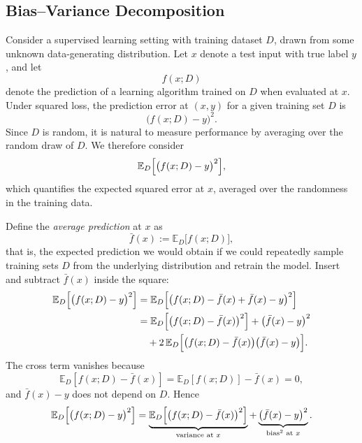 \documentclass[../main]{subfiles}
\begin{document}
\subsection{Bias--Variance Decomposition}
Consider a supervised learning setting with training dataset $D$, drawn from
some unknown data-generating distribution.  Let $x$ denote a test input with
true label $y$, and let
\begin{equation}
    f(x;D)
\end{equation}
denote the prediction of a learning algorithm trained on $D$ when evaluated at
$x$.  Under squared loss, the prediction error at $(x,y)$ for a given training
set $D$ is
\begin{equation}
    \bigl(f(x;D) - y\bigr)^2.
\end{equation}
Since $D$ is random, it is natural to measure performance by averaging over the
random draw of $D$.  We therefore consider
\begin{equation}
    \mathbb{E}_{D}\Bigl[\bigl(f(x;D) - y\bigr)^2\Bigr],
\end{equation}
which quantifies the expected squared error at $x$, averaged over the
randomness in the training data.

Define the \emph{average prediction} at $x$ as
\begin{equation}
    \bar{f}(x)
    := \mathbb{E}_{D}\bigl[f(x;D)\bigr],
\end{equation}
that is, the expected prediction we would obtain if we could repeatedly sample
training sets $D$ from the underlying distribution and retrain the model.
Insert and subtract $\bar{f}(x)$ inside the square:
\begin{align}
    \mathbb{E}_{D}\Bigl[\bigl(f(x;D) - y\bigr)^2\Bigr]
    &= \mathbb{E}_{D}
       \Bigl[\bigl(f(x;D) - \bar{f}(x) + \bar{f}(x) - y\bigr)^2\Bigr]\\
    &= \mathbb{E}_{D}
       \Bigl[\bigl(f(x;D) - \bar{f}(x)\bigr)^2\Bigr]
       + \bigl(\bar{f}(x) - y\bigr)^2\\
    &\quad
       + 2\,\mathbb{E}_{D}\Bigl[\bigl(f(x;D) - \bar{f}(x)\bigr)\bigl(\bar{f}(x) - y\bigr)\Bigr].
\end{align}
The cross term vanishes because
\begin{equation}
    \mathbb{E}_{D}[f(x;D) - \bar{f}(x)]
    = \mathbb{E}_{D}[f(x;D)] - \bar{f}(x) = 0,
\end{equation}
and $\bar{f}(x)-y$ does not depend on $D$.  Hence
\begin{equation}
    \mathbb{E}_{D}\Bigl[\bigl(f(x;D) - y\bigr)^2\Bigr]
    =
    \underbrace{\mathbb{E}_{D}
    \Bigl[\bigl(f(x;D) - \bar{f}(x)\bigr)^2\Bigr]}_{\text{variance at }x}
    +
    \underbrace{\bigl(\bar{f}(x) - y\bigr)^2}_{\text{bias}^2 \text{ at }x}.
\end{equation}
\end{document}
